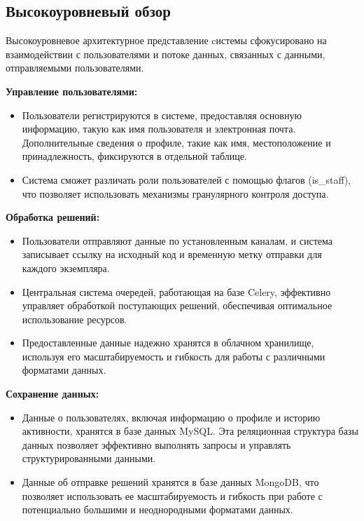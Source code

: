 \subsection{Высокоуровневый обзор}
Высокоуровневое архитектурное представление cистемы сфокусировано на взаимодействии с пользователями и потоке данных, связанных с данными, отправляемыми пользователями.

\textbf{Управление пользователями:}
\noindent
\begin{itemize}
    \itemsep 0em
    \item Пользователи регистрируются в системе, предоставляя основную информацию, такую как имя пользователя и электронная почта. Дополнительные сведения о профиле, такие как имя, местоположение и принадлежность, фиксируются в отдельной таблице.
   \item Система сможет различать роли пользователей с помощью флагов (is\_staff), что позволяет использовать механизмы гранулярного контроля доступа.
\end{itemize}

\textbf{Обработка решений:}
\noindent
\begin{itemize}
    \itemsep 0em
    \item Пользователи отправляют данные по установленным каналам, и система записывает ссылку на исходный код и временную метку отправки для каждого экземпляра.
    \item Центральная система очередей, работающая на базе Celery, эффективно управляет обработкой поступающих решений, обеспечивая оптимальное использование ресурсов.
    \item Предоставленные данные надежно хранятся в облачном хранилище, используя его масштабируемость и гибкость для работы с различными форматами данных.
\end{itemize}

\textbf{Сохранение данных:}
\noindent
\begin{itemize}
\itemsep 0em
    \item Данные о пользователях, включая информацию о профиле и историю активности, хранятся в базе данных MySQL. Эта реляционная структура базы данных позволяет эффективно выполнять запросы и управлять структурированными данными.
    \item Данные об отправке решений хранятся в базе данных MongoDB, что позволяет использовать ее масштабируемость и гибкость при работе с потенциально большими и неоднородными форматами данных.
\end{itemize}

